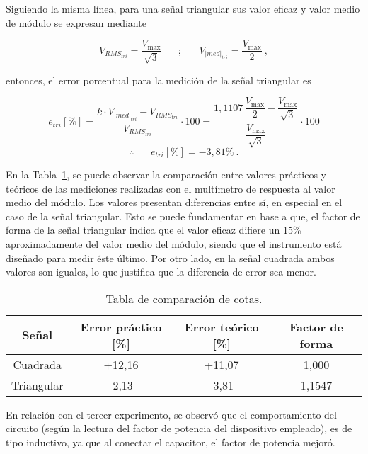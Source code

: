     Siguiendo la misma línea, para una señal triangular sus valor eficaz y valor
    medio de módulo se expresan mediante

    \vspace{-5pt}
$$ V_{RMS_{tri}} = \dfrac{V_{\max}}{\sqrt{3}} \hspace{20pt} ; \hspace{20pt} V_{|med|_{tri}} = \dfrac{V_{\max}}{2}~, $$

    \noindent entonces, el error porcentual para la medición de 
    la señal triangular es

    \vspace{-5pt}
    $$ e_{tri} [\%] = \dfrac{k\cdot V_{|med|_{tri}} - V_{RMS_{tri}}}{V_{RMS_{tri}}} \cdot 100
    = \dfrac{ 1,1107\, \dfrac{V_{\max}}{2} - \dfrac{V_{\max}}{\sqrt{3}} }{\dfrac{V_{\max}}{\sqrt{3}}} \cdot 100 $$
              $$  \therefore \hspace{20pt} \boxed{e_{tri}[\%] = -3,81\%}~.
    $$

    En la Tabla~\ref{tab:ComparacionCotas}, se puede observar la comparación entre valores
    prácticos y teóricos de las mediciones realizadas con el multímetro de respuesta al 
    valor medio del módulo. Los valores presentan diferencias entre sí, en especial
    en el caso de la señal triangular. Esto se
    puede fundamentar en base a que, el factor de forma de la señal triangular indica que el valor eficaz
    difiere un 15\% aproximadamente del valor medio del módulo, siendo que el instrumento está
    diseñado para medir éste último. Por otro lado, en la señal cuadrada ambos valores
    son iguales, lo que justifica que la diferencia de error sea menor.

    \begin{table}[H] \centering
      \begin{tabular}{|c|c|c|c|} \hline
        \textbf{Señal}       & \textbf{Error práctico [\%]}  & \textbf{Error teórico [\%]} & \textbf{Factor de forma} \\ \hline
        Cuadrada    & +12,16               & +11,07              &  1,000              \\ \hline
        Triangular  & -2,13                & -3,81              &  1,1547         \\ \hline
      \end{tabular}
      \caption{Tabla de comparación de cotas.}
      \label{tab:ComparacionCotas}
    \end{table}

En relación con el tercer experimento, se observó que el comportamiento del 
circuito (según la lectura del factor de potencia del dispositivo empleado), 
es de tipo inductivo, ya que al conectar el capacitor, el factor de potencia 
mejoró.


